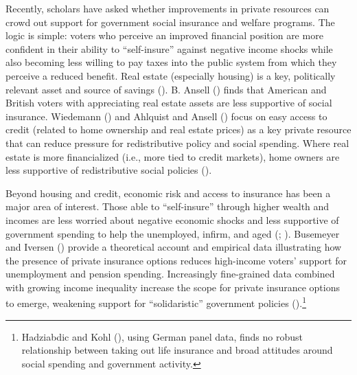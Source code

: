 \documentclass[
  11pt,
  oneside]{article}
\begin{document}
Recently, scholars have asked whether improvements in private resources can crowd out support for government social insurance and welfare programs. The logic is simple: voters who perceive an improved financial position are more confident in their ability to ``self-insure'' against negative income shocks while also becoming less willing to pay taxes into the public system from which they perceive a reduced benefit. Real estate (especially housing) is a key, politically relevant asset and source of savings (). B. Ansell () finds that American and British voters with appreciating real estate assets are less supportive of social insurance. Wiedemann () and Ahlquist and Ansell () focus on easy access to credit (related to home ownership and real estate prices) as a key private resource that can reduce pressure for redistributive policy and social spending. Where real estate is more financialized (i.e., more tied to credit markets), home owners are less supportive of redistributive social policies ().

Beyond housing and credit, economic risk and access to insurance has been a major area of interest. Those able to ``self-insure'' through higher wealth and incomes are less worried about negative economic shocks and less supportive of government spending to help the unemployed, infirm, and aged (; ). Busemeyer and Iversen () provide a theoretical account and empirical data illustrating how the presence of private insurance options reduces high-income voters' support for unemployment and pension spending. Increasingly fine-grained data combined with growing income inequality increase the scope for private insurance options to emerge, weakening support for ``solidaristic'' government policies ().\footnote{Hadziabdic and Kohl (), using German panel data, finds no robust relationship between taking out life insurance and broad attitudes around social spending and government activity.}
\end{document}

